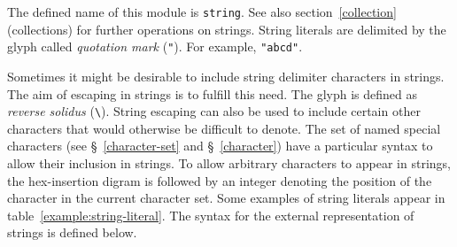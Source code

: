 \label{string}
\begin{optDefinition}
The defined name of this module is {\tt string}.  See also
section~\ref{collection} (collections) for further operations on
strings.
%
%
String literals are
delimited by the glyph called {\em quotation mark\/} (\verb+"+).  For
example, \verb+"abcd"+.

Sometimes it might be desirable to include string delimiter characters in
strings.  The aim of escaping in strings  is
to fulfill this need.  The 
 glyph is defined as {\em reverse
    solidus\/} (\verb+\+).  String escaping can also be used to include certain
other characters that would otherwise be difficult to denote.  The set of named
special characters (see \S~\ref{character-set} and \S~\ref{character}) have a
particular syntax to allow their inclusion in strings.  To allow arbitrary
characters to appear in strings, the hex-insertion digram is followed by an
integer denoting the position of the character in the current character set.
Some examples of string literals appear in table~\ref{example:string-literal}.
The syntax for the external representation of strings is defined below.
%
\Syntax
\label{string-syntax}
%


\end{optDefinition}
